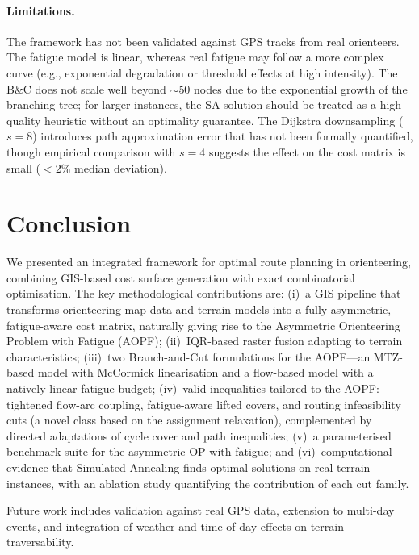 \documentclass[preprint,11pt]{elsarticle}
\begin{document}
\paragraph{Limitations.}
The framework has not been validated against GPS tracks from real orienteers.
The fatigue model is linear, whereas real fatigue may follow a more complex curve (e.g., exponential degradation or threshold effects at high intensity).
The B\&C does not scale well beyond $\sim$50 nodes due to the exponential growth of the branching tree; for larger instances, the SA solution should be treated as a high-quality heuristic without an optimality guarantee.
The Dijkstra downsampling ($s = 8$) introduces path approximation error that has not been formally quantified, though empirical comparison with $s = 4$ suggests the effect on the cost matrix is small ($< 2\%$ median deviation).

\section{Conclusion}
\label{sec:conclusion}
 
We presented an integrated framework for optimal route planning in orienteering, combining GIS-based cost surface generation with exact combinatorial optimisation.
The key methodological contributions are:
(i)~a GIS pipeline that transforms orienteering map data and terrain models into a fully asymmetric, fatigue-aware cost matrix, naturally giving rise to the Asymmetric Orienteering Problem with Fatigue (AOPF);
(ii)~IQR-based raster fusion adapting to terrain characteristics;
(iii)~two Branch-and-Cut formulations for the AOPF---an MTZ-based model with McCormick linearisation and a flow-based model with a natively linear fatigue budget;
(iv)~valid inequalities tailored to the AOPF: tightened flow-arc coupling, fatigue-aware lifted covers, and routing infeasibility cuts (a novel class based on the assignment relaxation), complemented by directed adaptations of cycle cover and path inequalities;
(v)~a parameterised benchmark suite for the asymmetric OP with fatigue; and
(vi)~computational evidence that Simulated Annealing finds optimal solutions on real-terrain instances, with an ablation study quantifying the contribution of each cut family.

Future work includes validation against real GPS data, extension to multi-day events, and integration of weather and time-of-day effects on terrain traversability.
\end{document}
